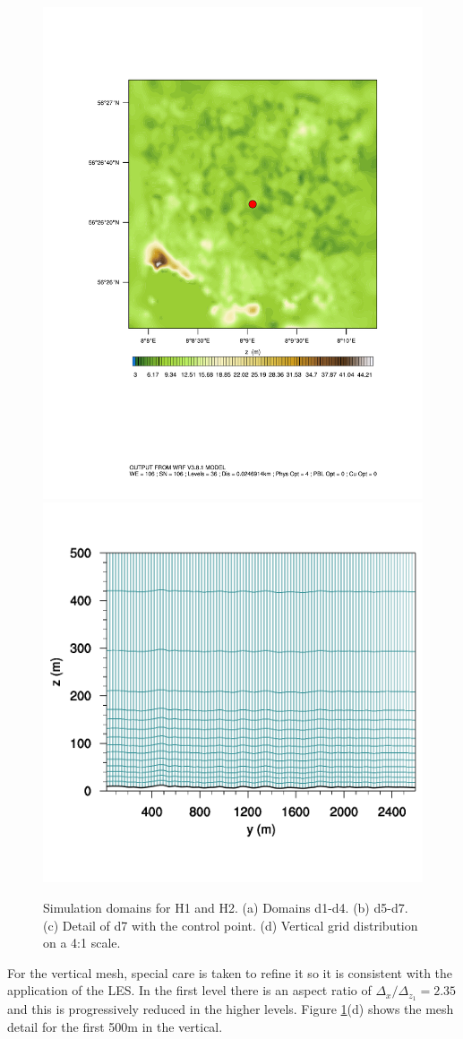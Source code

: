 \begin{figure}
	\includegraphics[width=0.3\linewidth,trim={2.5cm 6.5cm 2cm 3.5cm},clip]{Imagenes/05/hov_control_point.pdf}%
	\includegraphics[width=0.4\linewidth,trim={0.5cm 4cm 0cm 3cm},clip]{Imagenes/05/mesh57}%
	
	\caption{Simulation domains for H1 and H2. (a) Domains d1-d4. (b) d5-d7. (c) Detail of d7 with the control point. (d)  Vertical grid distribution on a 4:1 scale.}
	\label{fig:05_dom_hov}
\end{figure}

For the vertical mesh, special care is taken to refine it so it is consistent with the application of the LES. In the first level there is an aspect ratio of $\Delta_x/\Delta_{z_1}=2.35$ and this is progressively reduced in the higher levels. Figure \ref{fig:05_dom_hov}(d) shows the mesh detail for the first 500m in the vertical.

